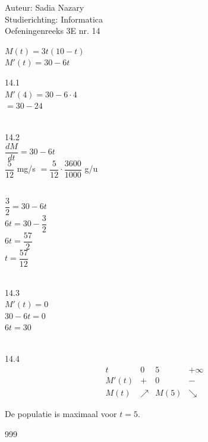 \documentclass[a4paper]{article}
\begin{document}
  
\noindent \large Auteur: Sadia Nazary  \\
\noindent \large Studierichting: Informatica\\
\noindent \large Oefeningenreeks 3E nr. 14\\

\medskip

\normalsize

$M(t)=3t(10-t)$\\

$M'(t)=30-6t$\\

\medskip

14.1\\

$M'(4)=30-6\cdot4$\\

$=30-24$\\

\\

\medskip

14.2\\

$\dfrac{dM}{dt}=30-6t$\\

$\dfrac{5}{12}$ mg/s $=\dfrac{5}{12}\cdot\dfrac{3600}{1000}$ g/u\\

\\

\medskip

$\dfrac{3}{2}=30-6t$\\

$6t=30-\dfrac{3}{2}$\\

$6t=\dfrac{57}{2}$\\

$t=\dfrac{57}{12}$\\

\\

\medskip

14.3\\

$M'(t)=0$\\

$30-6t=0$\\

$6t=30$\\

\\

\medskip

14.4\\

\[
\begin{array}{c|ccc}
t & 0 & 5 & +\infty \\
\hline
M'(t) & + & 0 & - \\
M(t) & \nearrow & M(5) & \searrow
\end{array}
\]

De populatie is maximaal voor $t=5$.

\begin{thebibliography}{999}
\end{thebibliography}
\end{document}
